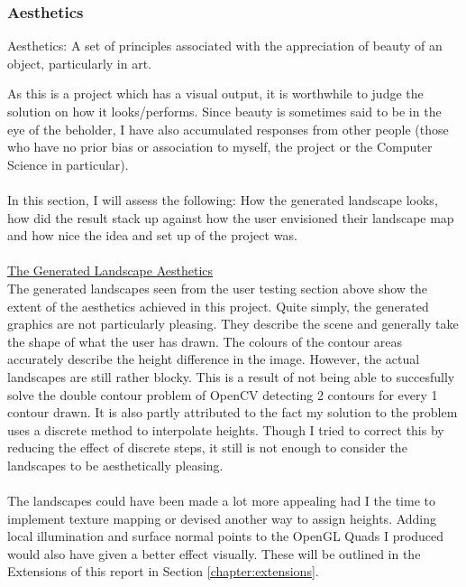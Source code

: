 \documentclass[11pt]{article}
\begin{document}
\subsubsection{Aesthetics}
\begin{center}
	Aesthetics: A set of principles associated with the appreciation of beauty
	of an object, particularly in art. 
\end{center}

As this is a project which has a visual output, it is worthwhile to
judge the solution on how it looks/performs. Since beauty is 
sometimes said to be in the eye of the beholder, I have also accumulated
responses from other people (those who have no prior bias or association
to myself, the project or the Computer Science in particular).\\
\\
In this section, I will assess the following: How the generated landscape
looks, how did the result stack up against how the user envisioned their
landscape map and how nice the idea and set up of the project was.\\
\\
\underline{The Generated Landscape Aesthetics}\\
The generated landscapes seen from the user testing section above show
the extent of the aesthetics achieved in this project. Quite simply,
the generated graphics are not particularly pleasing. They describe the
scene and generally take the shape of what the user has drawn. The
colours of the contour areas accurately describe the height difference
in the image. However, the actual landscapes are still rather blocky. This is
a result of not being able to succesfully solve the double contour problem
of OpenCV detecting 2 contours for every 1 contour drawn. It is 
also partly attributed to the fact my solution to the problem uses
a discrete method to interpolate heights. Though I tried to correct this by
reducing the effect of discrete steps, it still is not enough to consider
the landscapes to be aesthetically pleasing. \\
\\
The landscapes could have been made a lot more appealing had I the time
to implement texture mapping or devised another way to assign heights.
Adding local illumination and surface normal points to the OpenGL Quads
I produced would also have given a better effect visually. These will
be outlined in the Extensions of this report in Section \ref{chapter:extensions}.\\
\\
\end{document}

